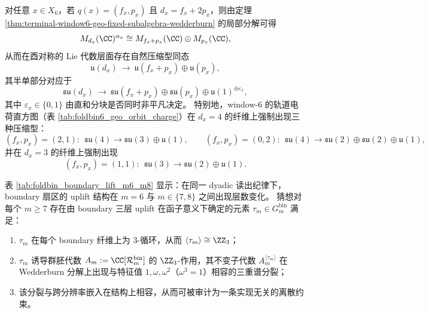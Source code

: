 \begin{corollary}[轨道电荷的局部分块与半单对称压缩的内生样式]\label{cor:terminal-window6-geo-orbit-charge-symmetry-compression}
对任意 \(x\in X_6\)，若 \(q(x)=(f_x,p_x)\) 且 \(d_x=f_x+2p_x\)，则由定理 \ref{thm:terminal-window6-geo-fixed-subalgebra-wedderburn} 的局部分解可得
\[
M_{d_x}(\CC)^{\alpha_x}\cong M_{f_x+p_x}(\CC)\oplus M_{p_x}(\CC),
\]
从而在酉对称的 Lie 代数层面存在自然压缩型同态
\[
\mathfrak u(d_x)\ \longrightarrow\ \mathfrak u(f_x+p_x)\oplus \mathfrak u(p_x),
\]
其半单部分对应于
\[
\mathfrak{su}(d_x)\ \longrightarrow\ \mathfrak{su}(f_x+p_x)\oplus \mathfrak{su}(p_x)\oplus \mathfrak u(1)^{\oplus \varepsilon_x},
\]
其中 \(\varepsilon_x\in\{0,1\}\) 由直和分块是否同时非平凡决定。
特别地，window-\(6\) 的轨道电荷直方图（表 \ref{tab:foldbin6_geo_orbit_charge}）在 \(d_x=4\) 的纤维上强制出现三种压缩型：
\[
(f_x,p_x)=(2,1):\ \ \mathfrak{su}(4)\to \mathfrak{su}(3)\oplus \mathfrak u(1),\qquad
(f_x,p_x)=(0,2):\ \ \mathfrak{su}(4)\to \mathfrak{su}(2)\oplus \mathfrak{su}(2)\oplus \mathfrak u(1),
\]
并在 \(d_x=3\) 的纤维上强制出现
\[
(f_x,p_x)=(1,1):\ \ \mathfrak{su}(3)\to \mathfrak{su}(2)\oplus \mathfrak u(1).
\]
\end{corollary}

\begin{conjecture}\label{conj:terminal-bdry-uplift-z3-deck-splitting}
表 \ref{tab:foldbin_boundary_lift_m6_m8} 显示：在同一 dyadic 读出纪律下，boundary 扇区的 uplift 结构在 \(m=6\) 与 \(m\in\{7,8\}\) 之间出现层数变化。
猜想对每个 \(m\ge 7\) 存在由 boundary 三层 uplift 在函子意义下确定的元素 \(\tau_m\in G_m^{\mathrm{bin}}\) 满足：
\begin{enumerate}
  \item \(\tau_m\) 在每个 boundary 纤维上为 \(3\)-循环，从而 \(\langle\tau_m\rangle\cong\ZZ_3\)；
  \item \(\tau_m\) 诱导群胚代数 \(A_m:=\CC[\mathcal R_m^{\mathrm{bin}}]\) 的 \(\ZZ_3\)-作用，其不变子代数 \(A_m^{\langle\tau_m\rangle}\) 在 Wedderburn 分解上出现与特征值 \(1,\omega,\omega^2\)（\(\omega^3=1\)）相容的三重谱分裂；
  \item 该分裂与跨分辨率嵌入在结构上相容，从而可被审计为一条实现无关的离散约束。
\end{enumerate}
\end{conjecture}

